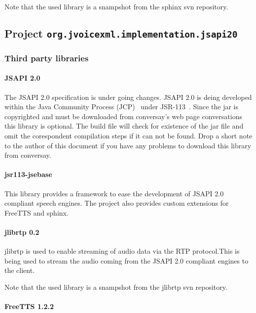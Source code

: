 \documentclass[11pt,a4paper]{article}
\begin{document}
Note that the used library is a snampshot from the sphinx svn repository.


\subsection{Project \lstinline{org.jvoicexml.implementation.jsapi20}}

\subsubsection{Third party libraries}
\label{sec:jsapi20-third-party-libr}

\paragraph{JSAPI 2.0}

The JSAPI 2.0 specification is under going changes.
JSAPI 2.0 is deing developed within
the Java Community Process (JCP)~\cite{jcp} under 
JSR-113~\cite{jcp:jsr113}. Since the jar is copyrighted and must be downloaded
from conversay's web page conversations~\cite{conversay:jsr113}
this library is optional. The
build file will check for existence of the jar file and omit the corespondent 
compilation steps if it can not be found. Drop a short note to the author of
this document if you have any problems to download this library from conversay.

\paragraph{jsr113-jsebase}

This library provides a framework to ease the development of JSAPI 2.0
compliant speech engines. The project also provides custom extensions for
FreeTTS and sphinx.

\paragraph{jlibrtp 0.2}

jlibrtp is used to enable streaming of audio data via the RTP protocol.This
is being used to stream the audio coming from the JSAPI 2.0 compliant
engines to the client.

Note that the used library is a snampshot from the jlibrtp svn repository.

\paragraph{FreeTTS 1.2.2}
\end{document}
